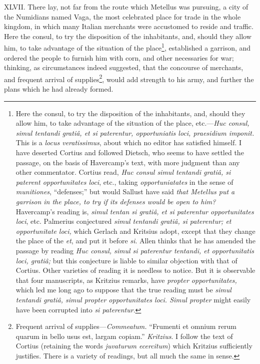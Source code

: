 XLVII. There lay, not far from the route which Metellus was pursuing,
a city of the Numidians named Vaga, the most celebrated place for
trade in the whole kingdom, in which many Italian merchants were
accustomed to reside and traffic. Here the consul, to try the
disposition of the inhabitants, and, should they allow him, to take
advantage of the situation of the place\footnote{Here the consul, to try the disposition of the inhabitants,
and, should they allow him, to take advantage of the situation of the
place, etc.—\emph{Huc consul, simul tentandi gratiâ, et si paterentur,
opportuniatis loci, praesidium imponit.} This is a \emph{locus
veratissimus}, about which no editor has satisfied himself. I have
deserted Cortius and followed Dietsch, who seems to have settled the
passage, on the basis of Havercamp's text, with more judgment than any
other commentator. Cortius read, \emph{Huc consul simul tentandi gratiâ, si
paterent opportunitates loci}, etc., taking \emph{opportuniatates} in the
sense of \emph{munitiones}, ``defenses;'' but would Sallust have said \emph{that
Metellus put a garrison in the place, to try if its defenses would be
open to him?} Havercamp's reading is, \emph{simul tentan si gratiâ, et si
paterentur opportunitates loci}, etc. Palmerius conjectured \emph{simul
tentandi gratiâ, si paterentur; et opportunitate loci,} which Gerlach
and Kritsius adopt, except that they change the place of the \emph{et}, and
put it before \emph{si}. Allen thinks that he has amended the passage by
reading \emph{Huc consul, simul si paterentur tentandi, et opportunitatis
loci, gratiâ;} but this conjecture is liable to similar objection with
that of Cortius. Other varieties of reading it is needless to notice.
But it is observable that four manuscripts, as Kritzius remarks, have
\emph{propter opportunitates,} which led me long ago to suppose that the
true reading must be \emph{simul tentandi gratiâ, simul propter
opportunitates loci. Simul propter} might easily have been corrupted
into \emph{si paterentur}.}, established a garrison,
and ordered the people to furnish him with corn, and other necessaries
for war; thinking, as circumstances indeed suggested, that the
concourse of merchants, and frequent arrival of supplies\footnote{Frequent arrival of supplies—\emph{Commeatum.} ``Frumenti et omnium
rerum quarum in bello usus est, largam copiam.'' \emph{Kritzius}. I follow
the text of Cortius (retaining the words \emph{juvaturum ecercitum})
which Kritzius sufficiently justifies. There is a variety of readings,
but all much the same in sense.}, would
add strength to his army, and further the plans which he had already
formed.

